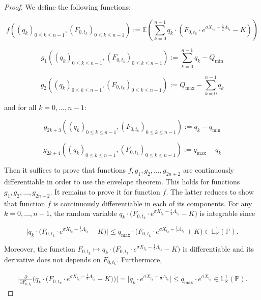 \documentclass{article}
\numberwithin{equation}{section}
\begin{document}
\begin{proof}
We define the following functions:


$$f\left((q_{k})_{0 \le k \le n-1}, (F_{0, t_k})_{0 \le k \le n-1} \right) := \mathbb{E}\left(\sum_{k = 0}^{n-1} q_{k} \cdot \left( F_{0, t_k} \cdot e^{\sigma X_{t_k} - \frac{1}{2}\Lambda_{t_k}} - K \right) \right)$$


$$g_1\left((q_{k})_{0 \le k \le n-1}, (F_{0, t_k})_{0 \le k \le n-1}\right) := \sum_{k=0}^{n-1} q_{k} - Q_{\min}$$

$$g_2\left((q_{k})_{0 \le k \le n-1}, (F_{0, t_k})_{0 \le k \le n-1}\right) := Q_{\max}- \sum_{k=0}^{n-1} q_{k} $$

\noindent
and for all $k = 0, \ldots, n-1$:

$$g_{2k+3}\left((q_{k})_{0 \le k \le n-1}, (F_{0, t_k})_{0 \le k \le n-1}\right) := q_{k} - q_{\min}$$

$$g_{2k+4}\left((q_{k})_{0 \le k \le n-1}, (F_{0, t_k})_{0 \le k \le n-1}\right) := q_{\max} - q_{k}$$

\noindent
Then it suffices to prove that functions $f, g_1, g_2, \ldots, g_{2n+2}$ are continuously differentiable in order to use the envelope theorem. This holds for functions $g_1, g_2, \ldots, g_{2n+2}$. It remains to prove it for function $f$. The latter reduces to show that function $f$ is continuously differentiable in each of its components. For any $k = 0, \ldots, n-1$, the random variable $q_{k} \cdot \big(F_{0, t_k} \cdot e^{\sigma X_{t_k} - \frac{1}{2}\Lambda_{t_k}} - K \big)$ is integrable since

$$\Big|q_{k} \cdot \big(F_{0, t_k} \cdot e^{\sigma X_{t_k} - \frac{1}{2}\Lambda_{t_k}} - K \big)\Big| \le q_{\max} \cdot \big( F_{0, t_k} \cdot e^{\sigma X_{t_k} - \frac{1}{2}\Lambda_{t_k}} + K \big) \in \mathbb{L}_\mathbb{R}^1(\mathbb{P}).$$

\noindent
Moreover, the function $F_{0, t_k} \mapsto q_{k} \cdot\big(F_{0, t_k} \cdot e^{\sigma X_{t_k} - \frac{1}{2}\Lambda_{t_k}} - K \big)$ is differentiable and its derivative does not depends on $F_{0, t_k}$. Furthermore,

\begin{align*}
\Big|\frac{\partial}{\partial F_{0, t_k}} \Big(q_{k} \cdot \big(F_{0, t_k} \cdot e^{\sigma X_{t_k} - \frac{1}{2}\Lambda_{t_k}} - K \big) \Big)\Big| = \big|q_{k} \cdot e^{\sigma X_{t_k} - \frac{1}{2}\Lambda_{t_k}} \Big| \le q_{\max} \cdot e^{\sigma X_{t_k}} \in \mathbb{L}_\mathbb{R}^1(\mathbb{P}).
\end{align*}


\end{proof}
\end{document}
